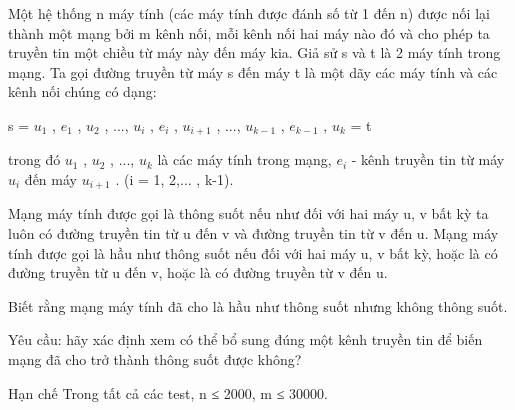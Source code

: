 Một hệ thống n máy tính (các máy tính được đánh số từ 1 đến n) được nối lại thành một mạng bởi m kênh nối, mỗi kênh nối hai máy nào đó và cho phép ta truyền tin một chiều từ máy này đến máy kia. Giả sử s và t là 2 máy tính trong mạng. Ta gọi đường truyền từ máy s đến máy t là một dãy các máy tính và các kênh nối chúng có dạng:  

   s = $u_{1}$   , $e_{1}$   , $u_{2}$   , ..., $u_{i}$   , $e_{i}$   , $u_{i+1}$   , ..., $u_{k-1}$   , $e_{k-1}$   , $u_{k}$   = t  

   trong đó $u_{1}$   , $u_{2}$   , ..., $u_{k}$   là các máy tính trong mạng, $e_{i}$   - kênh truyền tin từ máy $u_{i}$   đến máy $u_{i+1}$   . (i = 1, 2,... , k-1).  

   Mạng máy tính được gọi là thông suốt nếu như đối với hai máy u, v bất kỳ ta luôn có đường truyền tin từ u đến v và đường truyền tin từ v đến u. Mạng máy tính được gọi là hầu như thông suốt nếu đối với hai máy u, v bất kỳ, hoặc là có đường truyền từ u đến v, hoặc là có đường truyền từ v đến u.  

   Biết rằng mạng máy tính đã cho là hầu như thông suốt nhưng không thông suốt.  

   Yêu cầu: hãy xác định xem có thể bổ sung đúng một kênh truyền tin để biến mạng đã cho trở thành thông suốt được không?  

Hạn chế
Trong tất cả các test, n ≤ 2000, m ≤ 30000.